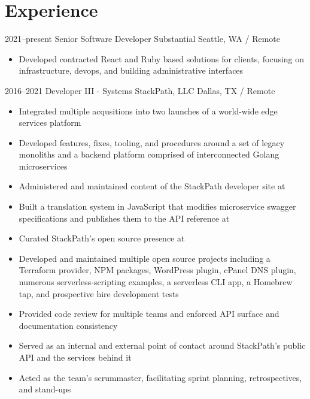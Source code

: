 \documentclass[11pt,a4paper,sans]{moderncv}
\begin{document}
  \pagebreak

  \section{Experience}
    \cventry
      {2021--present}
      {Senior Software Developer}
      {Substantial}
      {Seattle, WA / Remote}
      {}
      {
        \begin{itemize}
          \item Developed contracted React and Ruby based solutions for clients, focusing on infrastructure, devops, and building administrative interfaces
        \end{itemize}
      }

    \cventry
      {2016--2021}
      {Developer III - Systems}
      {StackPath, LLC}
      {Dallas, TX / Remote}
      {}
      {
        \begin{itemize}
          \item Integrated multiple acqusitions into two launches of a world-wide edge services platform
          \item Developed features, fixes, tooling, and procedures around a set of legacy monoliths and a backend platform comprised of interconnected Golang microservices
          \item Administered and maintained content of the StackPath developer site at 
          \item Built a translation system in JavaScript that modifies microservice swagger specifications and publishes them to the API reference at 
          \item Curated StackPath's open source presence at 
          \item Developed and maintained multiple open source projects including a Terraform provider, NPM packages, WordPress plugin, cPanel DNS plugin, numerous serverless-scripting examples, a serverless CLI app, a Homebrew tap, and prospective hire development tests
          \item Provided code review for multiple teams and enforced API surface and documentation consistency
          \item Served as an internal and external point of contact around StackPath's public API and the services behind it
          \item Acted as the team's scrummaster, facilitating sprint planning, retrospectives, and stand-ups
        \end{itemize}
      }
\end{document}
